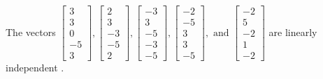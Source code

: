 \begin{exercise}
\begin{exerciseStatement}
  \end{exerciseStatement}
  \begin{exerciseAnswer}
   The vectors \(\left[\begin{array}{r}
3 \\
3 \\
0 \\
-5 \\
3
\end{array}\right] , \left[\begin{array}{r}
2 \\
3 \\
-3 \\
-5 \\
2
\end{array}\right] , \left[\begin{array}{r}
-3 \\
3 \\
-5 \\
-3 \\
-5
\end{array}\right] , \left[\begin{array}{r}
-2 \\
-5 \\
3 \\
3 \\
-5
\end{array}\right] , \text{ and } \left[\begin{array}{r}
-2 \\
5 \\
-2 \\
1 \\
-2
\end{array}\right]\) are 
  	 linearly independent  .
  


  \end{exerciseAnswer}
\end{exercise}